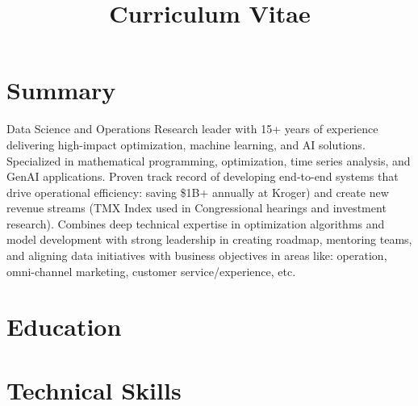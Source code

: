 \documentclass[12pt,a4paper,sans]{moderncv}
\title{Curriculum Vitae}
\begin{document}
\setlength{\parskip}{1em}
\makecvtitle


\section{Summary}
Data Science and Operations Research leader with 15+ years of experience delivering high-impact optimization, machine learning, and AI solutions. Specialized in mathematical programming, optimization, time series analysis, and GenAI applications. Proven track record of developing end-to-end systems that drive operational efficiency: saving \$1B+ annually at Kroger) and create new revenue streams (TMX Index used in Congressional hearings and investment research). Combines deep technical expertise in optimization algorithms and model development with strong leadership in creating roadmap, mentoring teams, and aligning data initiatives with business objectives in areas like: operation, omni-channel marketing, customer service/experience, etc. 
\section{Education}

\section{Technical Skills}
\end{document}
